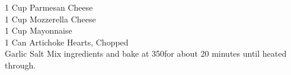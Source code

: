 {1 Cup Parmesan Cheese \\
 1 Cup Mozzerella Cheese \\
 1 Cup Mayonnaise \\
 1 Can Artichoke Hearts, Chopped \\
 Garlic Salt}
{Mix ingredients and bake at 350\degree for about 20 minutes until heated through.}
